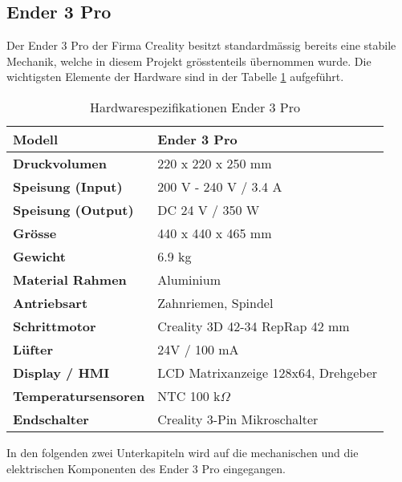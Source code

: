 \subsection{Ender 3 Pro}
\label{sec:Ender3Pro}


Der Ender 3 Pro der Firma Creality besitzt standardmässig bereits eine stabile Mechanik, welche in diesem Projekt grösstenteils übernommen wurde. Die wichtigsten Elemente der Hardware sind in der Tabelle \ref{tab:ender3prohardwarespecs} aufgeführt.

\begin{table}[h]
	\small
	\begin{center}
	\def\arraystretch{1.15} \tabcolsep=12pt
	\begin{tabular}{|l|l|}
		\hline
			\textbf{Modell} & Ender 3 Pro  \\ \hline
			\textbf{Druckvolumen} & 220 x 220 x 250 mm  \\ \hline
			\textbf{Speisung (Input)} & 200 V - 240 V / 3.4 A  \\ \hline
			\textbf{Speisung (Output)} & DC 24 V / 350 W  \\ \hline
			\textbf{Grösse} & 440 x 440 x 465 mm  \\ \hline
			\textbf{Gewicht} & 6.9 kg  \\ \hline
			\textbf{Material Rahmen} & Aluminium  \\ \hline
			\textbf{Antriebsart} & Zahnriemen, Spindel  \\ \hline
			\textbf{Schrittmotor} & Creality 3D 42-34 RepRap 42 mm  \\ \hline
			\textbf{Lüfter} & 24V / 100 mA  \\ \hline
			\textbf{Display / HMI} & LCD Matrixanzeige 128x64, Drehgeber  \\ \hline
			\textbf{Temperatursensoren} & NTC 100 k$\Omega$  \\ \hline
			\textbf{Endschalter} & Creality 3-Pin Mikroschalter  \\ \hline
		\end{tabular} 
	\end{center}
	\caption{Hardwarespezifikationen Ender 3 Pro}
	\label{tab:ender3prohardwarespecs}
\end{table}



In den folgenden zwei Unterkapiteln wird auf die mechanischen und die elektrischen Komponenten des Ender 3 Pro eingegangen.